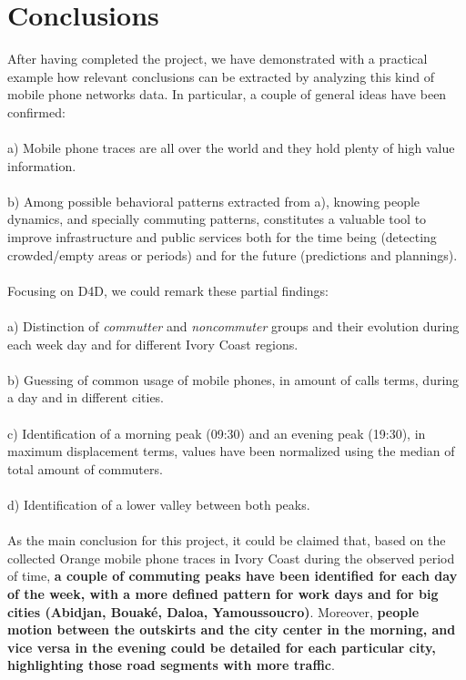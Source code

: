 \newpage
\section{Conclusions}

After having completed the project, we have demonstrated with a practical example how relevant conclusions can be extracted by analyzing this kind of mobile phone networks data. In particular, a couple of general ideas have been confirmed:
\\
\\
a) Mobile phone traces are all over the world and they hold plenty of high value information.
\\
\\
b) Among possible behavioral patterns extracted from a), knowing people dynamics, and specially commuting patterns, constitutes a valuable tool to improve infrastructure and public services both for the time being (detecting crowded/empty areas or periods) and for the future (predictions and plannings).
\\
\\
Focusing on D4D, we could remark these partial findings:
\\
\\
a) Distinction of {\it commutter} and {\it noncommuter} groups and their evolution during each week day and for different Ivory Coast regions.
\\
\\
b) Guessing of common usage of mobile phones, in amount of calls terms, during a day and in different cities.
\\
\\
c) Identification of a morning peak (09:30) and an evening peak (19:30), in maximum displacement terms, values have been normalized using the median of total amount of commuters.
\\
\\
d) Identification of a lower valley between both peaks.
\\
\\
As the main conclusion for this project, it could be claimed that, based on the collected Orange mobile phone traces in Ivory Coast during the observed period of time, {\bf a couple of commuting peaks have been identified for each day of the week, with a more defined pattern for work days and for big cities (Abidjan, Bouaké, Daloa, Yamoussoucro)}. Moreover, {\bf people motion between the outskirts and the city center in the morning, and vice versa in the evening could be detailed for each particular city, highlighting those road segments with more traffic}.
